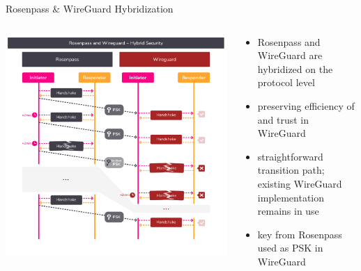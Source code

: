 \begin{frame}{Rosenpass \& WireGuard Hybridization}
  \begin{columns}[c]
    \begin{column}{.5\linewidth}
      \includegraphics[width=\linewidth, clip=true,trim=42 41 42 42]{graphics/rosenpass-wireguard-hybrid-security.pdf}
    \end{column}
    \begin{column}{.45\linewidth}
      \small
      \begin{itemize}
        \item Rosenpass and WireGuard are hybridized on the protocol level
        \item preserving efficiency of and trust in WireGuard
        \item straightforward transition path; existing WireGuard implementation remains in use
        \item key from Rosenpass used as PSK in WireGuard
      \end{itemize}
    \end{column}

  \end{columns}
\end{frame}

